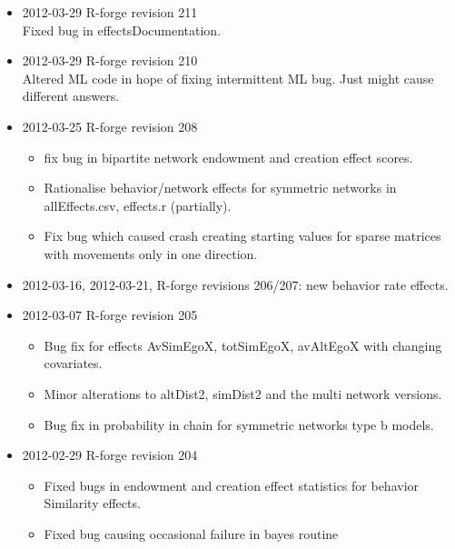 \documentclass[a4paper,fleqn,11pt]{article}
\newcommand{\+}{\, + \,}
\begin{document}
{\begin{small}
\begin{itemize}
\begin{itemize}
     (not that it is generally advisable to use such data sets).
     \item Incorporated argument simOnly in sienaModelCreate() to facilitate
	  simulation without estimation.
     \item Incorporated argument allowOnly in sienaNet() to permit
	  ignoring monotonicity in data and its consequences for upOnly and downOnly.
     \item Some new effects: interactions between reciprocity and
       transitivity.
    \end{itemize}
\item 2012-03-29 R-forge revision 211\\
Fixed bug in effectsDocumentation.
\item 2012-03-29 R-forge revision 210\\
Altered ML code in hope of fixing intermittent ML bug. Just might cause
different answers.
\item 2012-03-25 R-forge revision 208
\begin{itemize}
\item fix bug in bipartite network endowment
  and creation effect scores.
\item Rationalise behavior/network effects for symmetric
  networks in allEffects.csv, effects.r (partially).
\item Fix bug which caused crash creating starting values for sparse matrices
  with movements only in one direction.
\end{itemize}
\item 2012-03-16, 2012-03-21, R-forge revisions 206/207: new behavior rate
  effects.
\item 2012-03-07 R-forge revision 205
\begin{itemize}
\item Bug fix for effects AvSimEgoX, totSimEgoX, avAltEgoX with changing
  covariates.
\item Minor alterations to altDist2, simDist2 and the multi network
  versions.
\item Bug fix in probability in chain for symmetric networks type b models.
\end{itemize}
\item 2012-02-29 R-forge revision 204
\begin{itemize}
\item Fixed bugs in endowment and creation effect statistics for behavior
  Similarity effects.
\item Fixed bug causing occasional failure in bayes routine

\end{itemize}
\end{itemize}
\end{small}}
\end{document}
